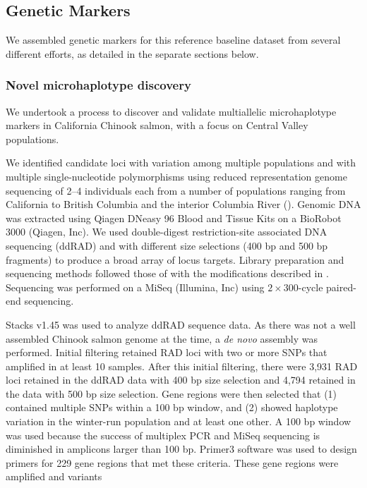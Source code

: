 \subsection*{Genetic Markers}

We assembled genetic markers for this reference baseline dataset from several different
efforts, as detailed in the separate sections below.

\subsubsection*{Novel microhaplotype discovery}

We undertook a process to discover and validate  multiallelic
microhaplotype \citep{baetscher2018microhaplotypes} markers in California Chinook salmon, with a focus on Central Valley populations. 

We identified candidate loci with variation among multiple populations and with multiple single-nucleotide polymorphisms using reduced representation genome sequencing of 2--4 individuals each from a number of
populations ranging from California to British 
Columbia and the interior Columbia River ().
Genomic DNA was extracted using Qiagen DNeasy 96 Blood and Tissue Kits on a BioRobot 3000 
(Qiagen, Inc). We used double-digest restriction-site associated DNA sequencing (ddRAD) and with different size selections (400 bp and 500 bp 
fragments) to produce a broad array of locus targets. Library preparation and sequencing methods followed those of
\citet{peterson2012double} with the modifications described in \citep{baetscher2018microhaplotypes}.
Sequencing was performed on a MiSeq (Illumina, Inc) using $2 \times 300$-cycle paired-end sequencing. 

Stacks v1.45 \cite{catchen2013stacks} was used to analyze ddRAD sequence data.  As there was not a well assembled Chinook salmon genome at the time, a {\em de novo} assembly was performed.  Initial filtering retained RAD loci with two or more SNPs that 
amplified in at least 10 samples. After this initial filtering, there were 3,931 RAD loci retained in the ddRAD data with 400 bp size selection and
4,794 retained in the data with 500 bp size selection. 
Gene regions were then selected that (1) contained multiple SNPs within a 100 bp window, and (2) showed haplotype variation in the winter-run 
population and at least one other.
A 100 bp window was used because the success of multiplex PCR and MiSeq sequencing is diminished in amplicons larger than 100 bp. Primer3 
software \citep{untergasser2012primer3} was used to design primers for 229 gene regions that met these criteria.  These gene regions were amplified and variants 

